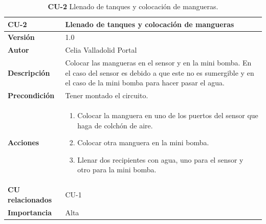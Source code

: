 \begin{table}[H]
	\centering
	\begin{tabularx}{\linewidth}{ p{} p{} }
		\toprule
            \rowcolor[HTML]{B0E0E6}
		\textbf{CU-2}    & \textbf{Llenado de tanques y colocación de mangueras}\\
		\toprule
		\textbf{Versión}              & 1.0    \\
		\textbf{Autor}                & Celia Valladolid Portal \\
		\textbf{Descripción}          & Colocar las mangueras en el sensor y en la mini bomba. En el caso del sensor es debido a que este no es sumergible y en el caso de la mini bomba para hacer pasar el agua. \\
		\textbf{Precondición}         & Tener montado el circuito. \\
		\textbf{Acciones}             &
		\begin{enumerate}
			\def\labelenumi{\arabic{enumi}.}
			\tightlist
                \item Colocar la manguera en uno de los puertos del sensor que haga de colchón de aire.
			\item Colocar otra manguera en la mini bomba.
                \item Llenar dos recipientes con agua, uno para el sensor y otro para la mini bomba.
		\end{enumerate}\\
		\textbf{CU relacionados}        & CU-1 \\
		\textbf{Importancia}          & Alta  \\
		\bottomrule
	\end{tabularx}
	\caption{\textbf{CU-2} Llenado de tanques y colocación de mangueras.}
        \label{tab:cu2}
\end{table}

